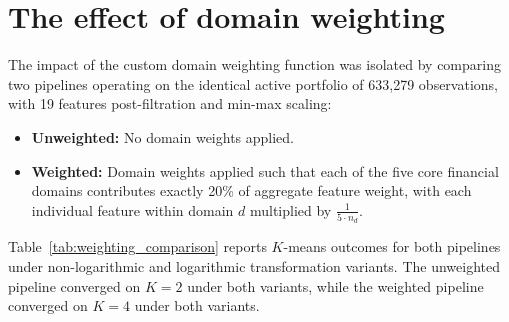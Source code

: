 \section{The effect of domain weighting}
\label{sec:results_weighting}

The impact of the custom domain weighting function was isolated by comparing two pipelines operating on the identical active portfolio of 633,279 observations, with 19 features post-filtration and min-max scaling:

\begin{itemize}
    \item \textbf{Unweighted:} No domain weights applied.
    \item \textbf{Weighted:} Domain weights applied such that each of the five core financial domains contributes exactly 20\% of aggregate feature weight, with each individual feature within domain $d$ multiplied by $\frac{1}{5 \cdot n_d}$.
\end{itemize}

Table~\ref{tab:weighting_comparison} reports $K$-means outcomes for both pipelines under non-logarithmic and logarithmic transformation variants.
The unweighted pipeline converged on $K=2$ under both variants, while the weighted pipeline converged on $K=4$ under both variants.
\begin{table}[H]
    \centering
    \renewcommand{\arraystretch}{1.3}
    \caption{$K$-means performance comparison between the unweighted improved pipeline and the weighted improved pipeline. Both configurations: active 633,279 observations, 19 features post-filtration, min-max scaling, no PCA.}
    \label{tab:weighting_comparison}
\end{table}

